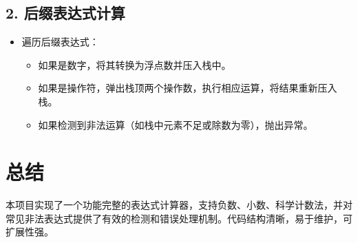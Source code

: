 \documentclass[12pt]{ctexart}
\begin{document}
\subsection*{2. 后缀表达式计算}
\begin{itemize}
    \item 遍历后缀表达式：
    \begin{itemize}
        \item 如果是数字，将其转换为浮点数并压入栈中。
        \item 如果是操作符，弹出栈顶两个操作数，执行相应运算，将结果重新压入栈。
        \item 如果检测到非法运算（如栈中元素不足或除数为零），抛出异常。
    \end{itemize}
\end{itemize}

\section*{总结}
本项目实现了一个功能完整的表达式计算器，支持负数、小数、科学计数法，并对常见非法表达式提供了有效的检测和错误处理机制。代码结构清晰，易于维护，可扩展性强。
\end{document}
